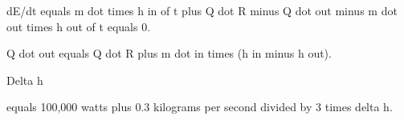 dE/dt equals m dot times h in of t plus Q dot R minus Q dot out minus m dot out times h out of t equals 0.  

Q dot out equals Q dot R plus m dot in times (h in minus h out).  

Delta h  

equals 100,000 watts plus 0.3 kilograms per second divided by 3 times delta h.